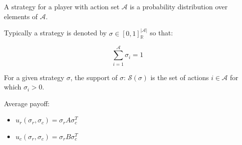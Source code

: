 \documentclass{beamer}              %
\begin{document}
\begin{frame}
    \begin{definition}
        A strategy for a player with action set $\mathcal{A}$ is a probability
        distribution over elements of $\mathcal{A}$.
    
        Typically a strategy is denoted by $\sigma \in [0, 1]^{|\mathcal{A}|}_{\mathbb{R}}$ so that:
    
        $$\sum_{i=1}^{\mathcal{A}}\sigma_i = 1$$
    \end{definition}
\end{frame}


\begin{frame}
    \begin{definition}
        For a given strategy \(\sigma\), the support of \(\sigma\):
        \(\mathcal{S}(\sigma)\) is the set of actions \(i\in\mathcal{A}\) for
        which \(\sigma_i > 0\).
    \end{definition}
\end{frame}



\begin{frame}
    \begin{definition}
    Average payoff:
        \begin{itemize}
            \item \(u_{r}(\sigma_r, \sigma_c) = \sigma_r A \sigma_c^T\)
            \item \(u_{c}(\sigma_r, \sigma_c)  = \sigma_r B \sigma_c^T\)
        \end{itemize}
    \end{definition}
\end{frame}
\end{document}
